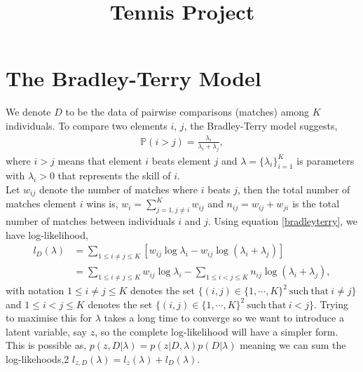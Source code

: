 \documentclass[11pt]{article}
\author{}
\title{Tennis Project}
\date{}
\numberwithin{equation}{section}
\begin{document}
\maketitle

\section{The Bradley-Terry Model}

We denote $D$ to be the data of pairwise comparisons (matches) among $K$ individuals. To compare two elements $i$, $j$, the Bradley-Terry model suggests, 
\begin{align} \label{bradleyterry}
\mathbb{P}(i >j) = \frac{\lambda_i}{\lambda_i + \lambda_j},
\end{align} 
where $i>j$ means that element $i$ beats element $j$ and $\lambda = \{\lambda_i\}_{i=1}^K$ is parameters with $\lambda_i >0$ that represents the skill of $i$. \\

Let $w_{ij}$ denote the number of matches where $i$ beats $j$, then the total number of matches element $i$ wins is, $w_i = \sum_{j=1, j \neq i}^K w_{ij}$ and $n_{ij} = w_{ij}+w_{ji}$ is the total number of matches between individuals $i$ and $j$. Using equation \ref{bradleyterry}, we have log-likelihood, 
\begin{align}
l_D(\lambda) &= \sum _{1 \leq i\neq j \leq K} [w_{ij}\log\lambda_i - w_{ij}\log(\lambda_i+\lambda_j)] \\
&= \sum _{1 \leq i\neq j \leq K} w_{ij}\log\lambda_i - \sum _{1 \leq i< j \leq K} n_{ij}\log(\lambda_i+\lambda_j),
\end{align}
with notation $1 \leq i\neq j \leq K$ denotes the set $\{(i,j) \in \{1,\cdots, K\}^2 \ \mathrm{such \ that} \ i\neq j \}$ and $1 \leq i<j \leq K$ denotes the set $\{(i,j) \in \{1,\cdots, K\}^2 \ \mathrm{such \ that} \ i<j \}$. Trying to maximise this for $\lambda$  takes a long time to converge so we want to introduce a latent variable, say $z$, so the complete log-likelihood will have a simpler form. This is possible as, $p(z,D|\lambda) = p(z|D,\lambda)p(D|\lambda)$ meaning we can sum the log-likehoods,2 $l_{z,D}(\lambda) = l_z(\lambda) + l_D(\lambda)$.\\
\end{document}
